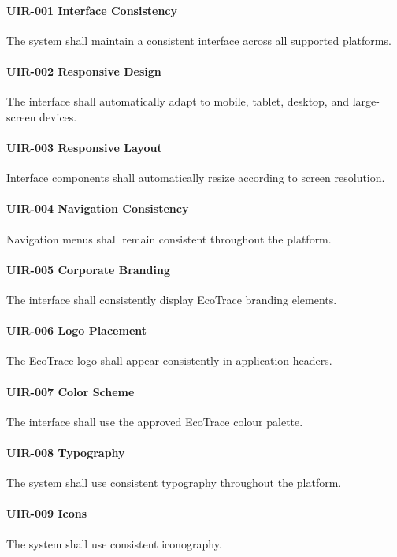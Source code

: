 \paragraph{UIR-001 Interface Consistency}
The system shall maintain a consistent interface across all supported
platforms.

\paragraph{UIR-002 Responsive Design}
The interface shall automatically adapt to mobile, tablet, desktop,
and large-screen devices.

\paragraph{UIR-003 Responsive Layout}
Interface components shall automatically resize according to screen
resolution.

\paragraph{UIR-004 Navigation Consistency}
Navigation menus shall remain consistent throughout the platform.

\paragraph{UIR-005 Corporate Branding}
The interface shall consistently display EcoTrace branding elements.

\paragraph{UIR-006 Logo Placement}
The EcoTrace logo shall appear consistently in application headers.

\paragraph{UIR-007 Color Scheme}
The interface shall use the approved EcoTrace colour palette.

\paragraph{UIR-008 Typography}
The system shall use consistent typography throughout the platform.

\paragraph{UIR-009 Icons}
The system shall use consistent iconography.

